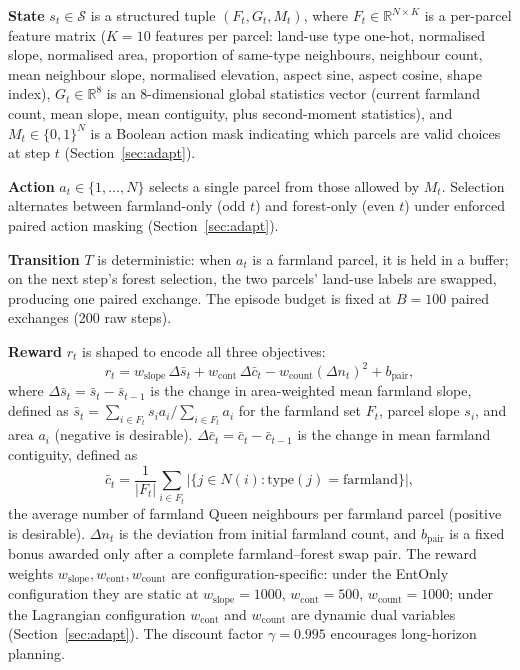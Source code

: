 \documentclass[]{interact}
\theoremstyle{plain}
\begin{document}
\textbf{State} $s_t \in \mathcal{S}$ is a structured tuple $(F_t, G_t, M_t)$, where $F_t \in \mathbb{R}^{N \times K}$ is a per-parcel feature matrix ($K=10$ features per parcel: land-use type one-hot, normalised slope, normalised area, proportion of same-type neighbours, neighbour count, mean neighbour slope, normalised elevation, aspect sine, aspect cosine, shape index), $G_t \in \mathbb{R}^8$ is an 8-dimensional global statistics vector (current farmland count, mean slope, mean contiguity, plus second-moment statistics), and $M_t \in \{0,1\}^N$ is a Boolean action mask indicating which parcels are valid choices at step $t$ (Section~\ref{sec:adapt}).

\textbf{Action} $a_t \in \{1, \ldots, N\}$ selects a single parcel from those allowed by $M_t$. Selection alternates between farmland-only (odd $t$) and forest-only (even $t$) under enforced paired action masking (Section~\ref{sec:adapt}).

\textbf{Transition} $T$ is deterministic: when $a_t$ is a farmland parcel, it is held in a buffer; on the next step's forest selection, the two parcels' land-use labels are swapped, producing one paired exchange. The episode budget is fixed at $B = 100$ paired exchanges (200 raw steps).

\textbf{Reward} $r_t$ is shaped to encode all three objectives:
\begin{equation}
r_t = w_{\text{slope}}\, \Delta \bar{s}_t + w_{\text{cont}}\, \Delta \bar{c}_t - w_{\text{count}} (\Delta n_t)^2 + b_{\text{pair}},
\label{eq:reward}
\end{equation}
where $\Delta \bar{s}_t = \bar{s}_t - \bar{s}_{t-1}$ is the change in area-weighted mean farmland slope, defined as $\bar{s}_t = \sum_{i \in F_t} s_i a_i / \sum_{i \in F_t} a_i$ for the farmland set $F_t$, parcel slope $s_i$, and area $a_i$ (negative is desirable). $\Delta \bar{c}_t = \bar{c}_t - \bar{c}_{t-1}$ is the change in mean farmland contiguity, defined as
\begin{equation}
\bar{c}_t = \frac{1}{|F_t|} \sum_{i \in F_t} |\{j \in N(i) : \mathrm{type}(j) = \mathrm{farmland}\}|,
\label{eq:contiguity}
\end{equation}
the average number of farmland Queen neighbours per farmland parcel (positive is desirable). $\Delta n_t$ is the deviation from initial farmland count, and $b_{\text{pair}}$ is a fixed bonus awarded only after a complete farmland--forest swap pair. The reward weights $w_{\text{slope}}, w_{\text{cont}}, w_{\text{count}}$ are configuration-specific: under the EntOnly configuration they are static at $w_{\text{slope}}=1000$, $w_{\text{cont}}=500$, $w_{\text{count}}=1000$; under the Lagrangian configuration $w_{\text{cont}}$ and $w_{\text{count}}$ are dynamic dual variables (Section~\ref{sec:adapt}). The discount factor $\gamma = 0.995$ encourages long-horizon planning.
\end{document}
